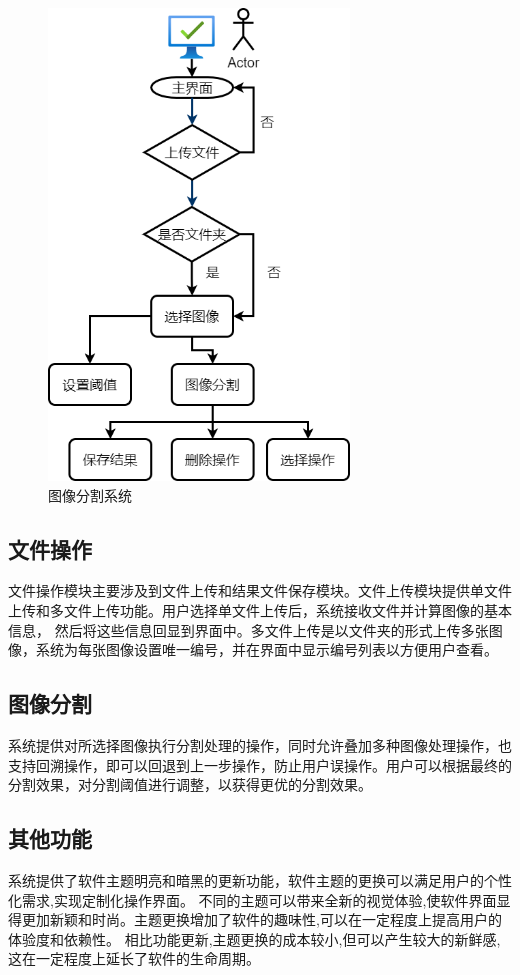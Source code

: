 \begin{figure}[htb]
    \centering
    \includegraphics[width=8cm]{fig/chap4/系统流程图2.png}
    \caption{图像分割系统}
    \label{fig:f4b}
\end{figure}

\subsection*{文件操作}
文件操作模块主要涉及到文件上传和结果文件保存模块。文件上传模块提供单文件上传和多文件上传功能。用户选择单文件上传后，系统接收文件并计算图像的基本信息，
然后将这些信息回显到界面中。多文件上传是以文件夹的形式上传多张图像，系统为每张图像设置唯一编号，并在界面中显示编号列表以方便用户查看。
\subsection*{图像分割}
系统提供对所选择图像执行分割处理的操作，同时允许叠加多种图像处理操作，也支持回溯操作，即可以回退到上一步操作，防止用户误操作。用户可以根据最终的分割效果，对分割阈值进行调整，以获得更优的分割效果。
\subsection*{其他功能}
系统提供了软件主题明亮和暗黑的更新功能，软件主题的更换可以满足用户的个性化需求,实现定制化操作界面。 不同的主题可以带来全新的视觉体验,使软件界面显得更加新颖和时尚。主题更换增加了软件的趣味性,可以在一定程度上提高用户的体验度和依赖性。 相比功能更新,主题更换的成本较小,但可以产生较大的新鲜感,这在一定程度上延长了软件的生命周期。
